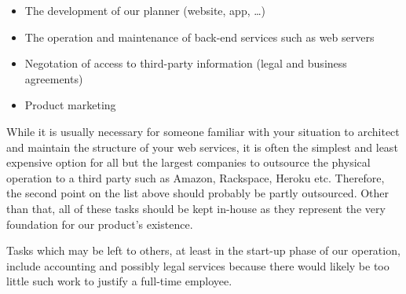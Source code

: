 \begin{itemize}
    \item The development of our planner (website, app, \ldots)
    \item The operation and maintenance of back-end services such as web servers
    \item Negotation of access to third-party information (legal and business
          agreements)
    \item Product marketing
\end{itemize}

While it is usually necessary for someone familiar with your situation to
architect and maintain the structure of your web services, it is often the
simplest and least expensive option for all but the largest companies to
outsource the physical operation to a third party such as Amazon, Rackspace,
Heroku etc. Therefore, the second point on the list above should probably be
partly outsourced. Other than that, all of these tasks should be kept in-house
as they represent the very foundation for our product's existence.

Tasks which may be left to others, at least in the start-up phase of our
operation, include accounting and possibly legal services because there would
likely be too little such work to justify a full-time employee.
